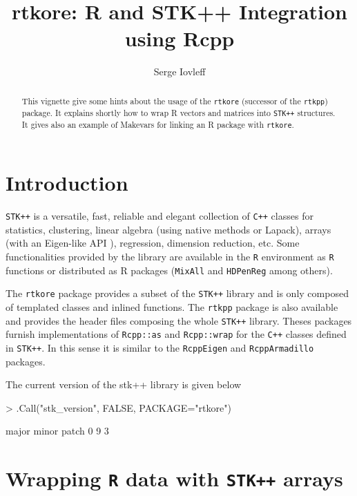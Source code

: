 \documentclass[a4paper,10pt]{article}
\title{ rtkore: R and STK++ Integration using Rcpp}
\author{Serge Iovleff}
\date{}
\newcommand{\rtkpp}{{\tt rtkpp}} %
\newcommand{\rtkore}{{\tt rtkore}} %
\newcommand{\stkpp}{{\tt STK++}} %
\begin{document}


\maketitle
\begin{abstract}
This vignette give some hints about the usage of the \rtkore{} (successor of
the \rtkpp{}) package. It explains shortly how to wrap R vectors and matrices
into \stkpp{}  structures. It gives also an example of Makevars for linking an R
package with \rtkore{}.
\end{abstract}

\section{Introduction}

\stkpp{} is a versatile, fast, reliable and elegant collection of \texttt{C++}
classes for statistics, clustering, linear algebra (using native methods or
Lapack\cite{Lapack}), arrays (with an Eigen-like API \cite{JSS:RcppEigen}),
regression, dimension reduction, etc. Some functionalities provided by the
library are available in the \texttt{R} environment as \texttt{R} functions or
distributed as R packages (\texttt{MixAll} \cite{MixAll} and \texttt{HDPenReg}
\cite{HDPenReg} among others).

The \rtkore{} package provides a subset of the \stkpp{}
library and is only composed of templated classes and inlined functions.
The \rtkpp{} package is also available and provides the header files composing
the whole \stkpp{} library. Theses packages furnish implementations of
\texttt{Rcpp::as} and \texttt{Rcpp::wrap} for the \texttt{C++} classes defined
in \stkpp{}. In this sense it is similar to the \texttt{RcppEigen}
\cite{CRAN:RcppEigen,JSS:RcppEigen} and \texttt{RcppArmadillo}
\cite{CRAN:RcppArmadillo} packages.

The current version of the stk++ library is given below
\begin{Schunk}
\begin{Sinput}
> .Call("stk_version", FALSE, PACKAGE="rtkore")
\end{Sinput}
\begin{Soutput}
major minor patch 
    0     9     3 
\end{Soutput}
\end{Schunk}

\section{Wrapping \texttt{R} data with \stkpp{} arrays}
\end{document}
